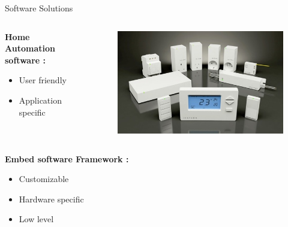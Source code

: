 \documentclass{beamer}
\begin{document}
\begin{frame}{Software Solutions}
\begin{columns}
\begin{column}[l]{0.5\textwidth}
\textbf{Home Automation software :}
\begin{itemize}
\item[\Large\smiley] User friendly
\item[\Large\frownie] Application specific

\end{itemize}
\end{column}
\begin{column}[r]{0.5\textwidth}
\begin{figure}
\includegraphics[width=\columnwidth]{figures/Home-Automation-Products.jpg}
\end{figure}
\end{column}
\end{columns}

\begin{columns}
\begin{column}[l]{0.5\textwidth}
\textbf{Embed software Framework  :}
\begin{itemize}
\item[\Large\smiley] Customizable

\item[\Large\frownie] Hardware specific
\item[\Large\frownie] Low level


\end{itemize}
\end{column}
\end{columns}
\end{frame}
\end{document}
